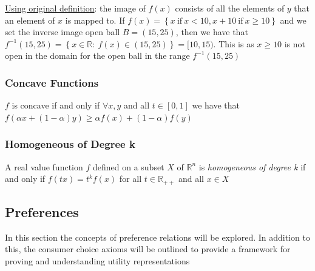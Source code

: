 \documentclass{article}
\begin{document}
  \par
  \underline{Using original definition}: the image of $f(x)$ consists of all the elements of $y$ that an element of $x$ is mapped to. If $f(x) = \left\{x \ \text{if} \ x < 10, x + 10 \ \text{if} \ x \geq 10 \right\}$ and we set the inverse image open ball $B = (15, 25)$, then  we have that $f^{-1}(15,25) = \left\{ x \in \mathbb{R}: \ f(x) \in (15, 25) \right\} = [10, 15)$. This is as $x \geq 10$ is not open in the domain for the open ball in the range $f^{-1}(15,25)$
  \par
\vspace{6mm}
\subsubsection{Concave Functions}
$f$ is concave if and only if $\forall x,y$ and all $t \in [0,1]$ we have that $f(\alpha x + (1-\alpha)y) \geq \alpha f(x) + (1-\alpha)f(y) $\par \vspace{0.3em}
\subsubsection{Homogeneous of Degree k}
A real value function $f$ defined on a subset $X$ of $\mathbb{R}^{n}$ is \textit{homogeneous of degree k} if and only if $f(tx) = t^{k}f(x)$ for all $t \in \mathbb{R}_{++}$ and all $x \in X$ \par \vspace{0.3em}

\newpage

\vspace{2.5mm}
\subsection{Preferences}
In this section the concepts of preference relations will be explored. In addition to this, the consumer choice axioms will be outlined to provide a framework for proving and understanding utility representations \par
\vspace{6mm}
\end{document}
